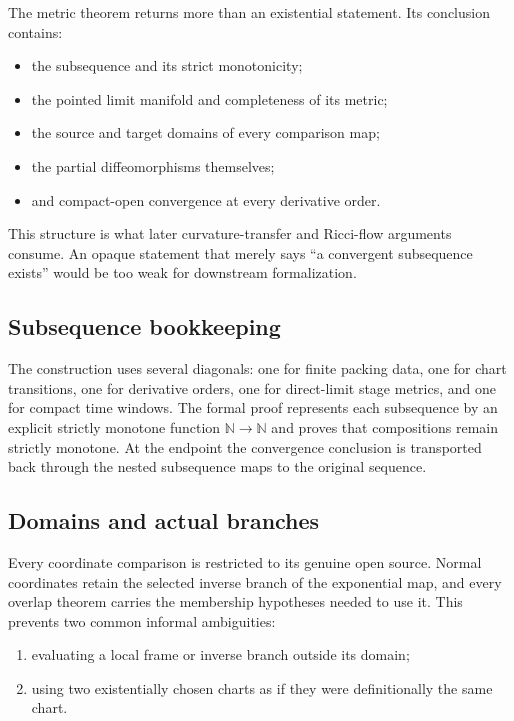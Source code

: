 \documentclass[11pt]{article}
\theoremstyle{plain}
\theoremstyle{definition}
\theoremstyle{remark}
\newcommand{\N}{\mathbb N}
\begin{document}
The metric theorem returns more than an existential statement.  Its
conclusion contains:
\begin{itemize}[leftmargin=2em]
  \item the subsequence and its strict monotonicity;
  \item the pointed limit manifold and completeness of its metric;
  \item the source and target domains of every comparison map;
  \item the partial diffeomorphisms themselves;
  \item and compact-open convergence at every derivative order.
\end{itemize}
This structure is what later curvature-transfer and Ricci-flow arguments
consume.  An opaque statement that merely says ``a convergent subsequence
exists'' would be too weak for downstream formalization.

\subsection{Subsequence bookkeeping}

The construction uses several diagonals: one for finite packing data, one for
chart transitions, one for derivative orders, one for direct-limit stage
metrics, and one for compact time windows.  The formal proof represents each
subsequence by an explicit strictly monotone function \(\N\to\N\) and proves
that compositions remain strictly monotone.  At the endpoint the convergence
conclusion is transported back through the nested subsequence maps to the
original sequence.

\subsection{Domains and actual branches}

Every coordinate comparison is restricted to its genuine open source.
Normal coordinates retain the selected inverse branch of the exponential
map, and every overlap theorem carries the membership hypotheses needed to
use it.  This prevents two common informal ambiguities:
\begin{enumerate}[leftmargin=2em]
  \item evaluating a local frame or inverse branch outside its domain;
  \item using two existentially chosen charts as if they were definitionally
  the same chart.
\end{enumerate}
\end{document}
